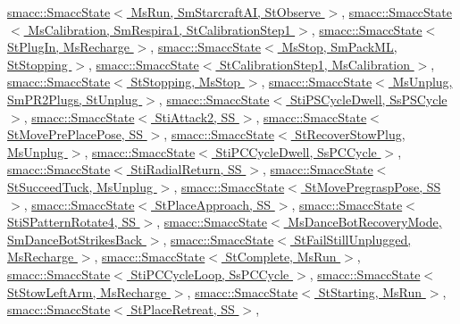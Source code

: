 \hyperlink{classsmacc_1_1SmaccState_afc39f8e0ca4001b2159a100da2fccd0e}{smacc\+::\+Smacc\+State$<$ Ms\+Run, Sm\+Starcraft\+A\+I, St\+Observe $>$}, \hyperlink{classsmacc_1_1SmaccState_afc39f8e0ca4001b2159a100da2fccd0e}{smacc\+::\+Smacc\+State$<$ Ms\+Calibration, Sm\+Respira1, St\+Calibration\+Step1 $>$}, \hyperlink{classsmacc_1_1SmaccState_afc39f8e0ca4001b2159a100da2fccd0e}{smacc\+::\+Smacc\+State$<$ St\+Plug\+In, Ms\+Recharge $>$}, \hyperlink{classsmacc_1_1SmaccState_afc39f8e0ca4001b2159a100da2fccd0e}{smacc\+::\+Smacc\+State$<$ Ms\+Stop, Sm\+Pack\+M\+L, St\+Stopping $>$}, \hyperlink{classsmacc_1_1SmaccState_afc39f8e0ca4001b2159a100da2fccd0e}{smacc\+::\+Smacc\+State$<$ St\+Calibration\+Step1, Ms\+Calibration $>$}, \hyperlink{classsmacc_1_1SmaccState_afc39f8e0ca4001b2159a100da2fccd0e}{smacc\+::\+Smacc\+State$<$ St\+Stopping, Ms\+Stop $>$}, \hyperlink{classsmacc_1_1SmaccState_afc39f8e0ca4001b2159a100da2fccd0e}{smacc\+::\+Smacc\+State$<$ Ms\+Unplug, Sm\+P\+R2\+Plugs, St\+Unplug $>$}, \hyperlink{classsmacc_1_1SmaccState_afc39f8e0ca4001b2159a100da2fccd0e}{smacc\+::\+Smacc\+State$<$ Sti\+P\+S\+Cycle\+Dwell, Ss\+P\+S\+Cycle $>$}, \hyperlink{classsmacc_1_1SmaccState_afc39f8e0ca4001b2159a100da2fccd0e}{smacc\+::\+Smacc\+State$<$ Sti\+Attack2, S\+S $>$}, \hyperlink{classsmacc_1_1SmaccState_afc39f8e0ca4001b2159a100da2fccd0e}{smacc\+::\+Smacc\+State$<$ St\+Move\+Pre\+Place\+Pose, S\+S $>$}, \hyperlink{classsmacc_1_1SmaccState_afc39f8e0ca4001b2159a100da2fccd0e}{smacc\+::\+Smacc\+State$<$ St\+Recover\+Stow\+Plug, Ms\+Unplug $>$}, \hyperlink{classsmacc_1_1SmaccState_afc39f8e0ca4001b2159a100da2fccd0e}{smacc\+::\+Smacc\+State$<$ Sti\+P\+C\+Cycle\+Dwell, Ss\+P\+C\+Cycle $>$}, \hyperlink{classsmacc_1_1SmaccState_afc39f8e0ca4001b2159a100da2fccd0e}{smacc\+::\+Smacc\+State$<$ Sti\+Radial\+Return, S\+S $>$}, \hyperlink{classsmacc_1_1SmaccState_afc39f8e0ca4001b2159a100da2fccd0e}{smacc\+::\+Smacc\+State$<$ St\+Succeed\+Tuck, Ms\+Unplug $>$}, \hyperlink{classsmacc_1_1SmaccState_afc39f8e0ca4001b2159a100da2fccd0e}{smacc\+::\+Smacc\+State$<$ St\+Move\+Pregrasp\+Pose, S\+S $>$}, \hyperlink{classsmacc_1_1SmaccState_afc39f8e0ca4001b2159a100da2fccd0e}{smacc\+::\+Smacc\+State$<$ St\+Place\+Approach, S\+S $>$}, \hyperlink{classsmacc_1_1SmaccState_afc39f8e0ca4001b2159a100da2fccd0e}{smacc\+::\+Smacc\+State$<$ Sti\+S\+Pattern\+Rotate4, S\+S $>$}, \hyperlink{classsmacc_1_1SmaccState_afc39f8e0ca4001b2159a100da2fccd0e}{smacc\+::\+Smacc\+State$<$ Ms\+Dance\+Bot\+Recovery\+Mode, Sm\+Dance\+Bot\+Strikes\+Back $>$}, \hyperlink{classsmacc_1_1SmaccState_afc39f8e0ca4001b2159a100da2fccd0e}{smacc\+::\+Smacc\+State$<$ St\+Fail\+Still\+Unplugged, Ms\+Recharge $>$}, \hyperlink{classsmacc_1_1SmaccState_afc39f8e0ca4001b2159a100da2fccd0e}{smacc\+::\+Smacc\+State$<$ St\+Complete, Ms\+Run $>$}, \hyperlink{classsmacc_1_1SmaccState_afc39f8e0ca4001b2159a100da2fccd0e}{smacc\+::\+Smacc\+State$<$ Sti\+P\+C\+Cycle\+Loop, Ss\+P\+C\+Cycle $>$}, \hyperlink{classsmacc_1_1SmaccState_afc39f8e0ca4001b2159a100da2fccd0e}{smacc\+::\+Smacc\+State$<$ St\+Stow\+Left\+Arm, Ms\+Recharge $>$}, \hyperlink{classsmacc_1_1SmaccState_afc39f8e0ca4001b2159a100da2fccd0e}{smacc\+::\+Smacc\+State$<$ St\+Starting, Ms\+Run $>$}, \hyperlink{classsmacc_1_1SmaccState_afc39f8e0ca4001b2159a100da2fccd0e}{smacc\+::\+Smacc\+State$<$ St\+Place\+Retreat, S\+S $>$}, 